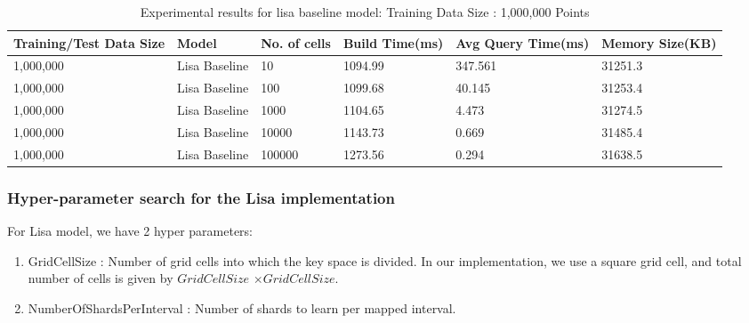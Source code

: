 \begin{table}[ht]
	\centering
	\begin{tabular}{||p{}<{\centering}|p{}<{\centering}| p{}<{\centering}|p{}<{\centering}|p{}<{\centering}|p{}<{\centering}||}
		\hline
		Training/Test Data Size& Model & No. of cells & Build Time(ms) & Avg Query Time(ms) & Memory Size(KB)\\ [0.5ex] 
		\hline
		\hline
		1,000,000& Lisa Baseline & 10 & 1094.99 & 347.561 & 31251.3\\
		\hline
		1,000,000& Lisa Baseline & 100 &1099.68 &40.145 & 31253.4\\
		\hline
		1,000,000& Lisa Baseline & 1000 & 1104.65 & 4.473 & 31274.5\\
		\hline
		1,000,000& Lisa Baseline & 10000 & 1143.73 & 0.669 & 31485.4\\
		\hline
		1,000,000& Lisa Baseline & 100000 & 1273.56 & 0.294 & 31638.5\\
		\hline
		\hline
	\end{tabular}
    \label{small_lognormal_lisa_baseline_10000}
	\caption{Experimental results for lisa baseline model: Training Data Size : 1,000,000 Points}
\end{table}



\subsubsection {Hyper-parameter search for the Lisa implementation}
For Lisa model, we have 2 hyper parameters:
\begin{enumerate}
	\item GridCellSize : Number of grid cells into which the key space is divided. In our implementation, we use a square grid cell, and total number of cells is given by $GridCellSize$ $\times GridCellSize$.
	\item NumberOfShardsPerInterval : Number of shards to learn per mapped interval. 
\end{enumerate}


